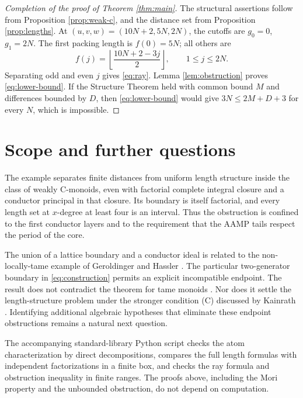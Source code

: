 \documentclass[11pt]{article}
\theoremstyle{definition}
\begin{document}
\begin{proof}[Completion of the proof of Theorem \ref{thm:main}]
The structural assertions follow from Proposition \ref{prop:weak-c}, and the distance set from Proposition \ref{prop:lengths}. At $(u,v,w)=(10N+2,5N,2N)$, the cutoffs are $g_0=0$, $g_1=2N$. The first packing length is $f(0)=5N$; all others are
\[
 f(j)=\left\lfloor\frac{10N+2-3j}{2}\right\rfloor,
 \qquad 1\leq j\leq2N.
\]
Separating odd and even $j$ gives \eqref{eq:ray}. Lemma \ref{lem:obstruction} proves \eqref{eq:lower-bound}. If the Structure Theorem held with common bound $M$ and differences bounded by $D$, then \eqref{eq:lower-bound} would give $3N\leq2M+D+3$ for every $N$, which is impossible.
\end{proof}

\newpage
\section{Scope and further questions}

The example separates finite distances from uniform length structure inside the class of weakly C-monoids, even with factorial complete integral closure and a conductor principal in that closure. Its boundary is itself factorial, and every length set at $x$-degree at least four is an interval. Thus the obstruction is confined to the first conductor layers and to the requirement that the AAMP tails respect the period of the core.

The union of a lattice boundary and a conductor ideal is related to the non-locally-tame example of Geroldinger and Hassler \cite[Example 6.11]{GH}. The particular two-generator boundary in \eqref{eq:construction} permits an explicit incompatible endpoint. The result does not contradict the theorem for tame monoids \cite{GK}. Nor does it settle the length-structure problem under the stronger condition (C) discussed by Kainrath \cite{K}. Identifying additional algebraic hypotheses that eliminate these endpoint obstructions remains a natural next question.

The accompanying standard-library Python script checks the atom characterization by direct decompositions, compares the full length formulas with independent factorizations in a finite box, and checks the ray formula and obstruction inequality in finite ranges. The proofs above, including the Mori property and the unbounded obstruction, do not depend on computation.
\end{document}
